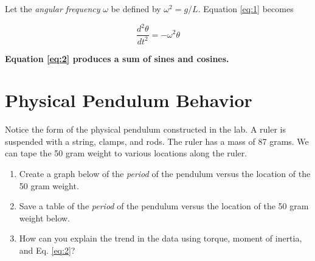 \documentclass{article}
\begin{document}
Let the \textit{angular frequency} $\omega$ be defined by $\omega^2 = g/L$.  Equation \ref{eq:1} becomes

\begin{equation}
\frac{d^2 \theta}{dt^2} = -\omega^2\theta \label{eq:2}
\end{equation}

\textbf{Equation \ref{eq:2} produces a sum of sines and cosines.}

\section{Physical Pendulum Behavior}

Notice the form of the physical pendulum constructed in the lab.  A ruler is suspended with a string, clamps, and rods.  The ruler has a mass of 87 grams.  We can tape the 50 gram weight to various locations along the ruler.

\begin{enumerate}
\item Create a graph below of the \textit{period} of the pendulum versus the location of the 50 gram weight. \\ \vspace{5cm}
\item Save a table of the \textit{period} of the pendulum versus the location of the 50 gram weight below. \\ \vspace{5cm}
\item How can you explain the trend in the data using torque, moment of inertia, and Eq. \ref{eq:2}?
\end{enumerate}
\end{document}
